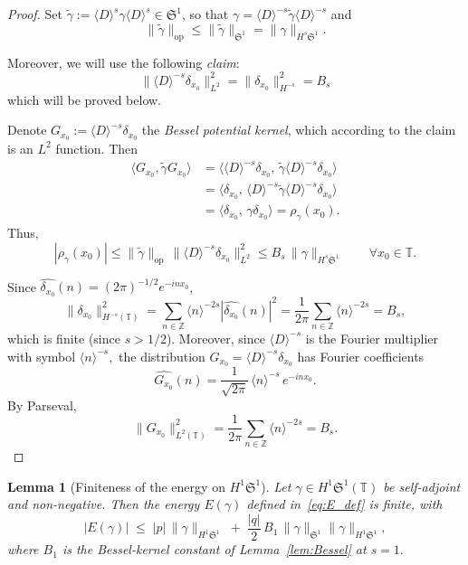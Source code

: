 \documentclass[11pt]{amsart}
\newtheorem{lemma}[theorem]{Lemma}
\theoremstyle{definition}
\newcommand{\T}{\mathbb{T}}
\newcommand{\Z}{\mathbb{Z}}
\newcommand{\Sp}{\mathfrak{S}}
\begin{document}
\begin{proof}
Set $\tilde\gamma:=\langle D\rangle^s\gamma\langle D\rangle^s\in\Sp^1$, so that $\gamma = \langle D\rangle^{-s}\tilde\gamma\langle D\rangle^{-s}$ and
\[
  \|\tilde\gamma\|_{\mathrm{op}}\le\|\tilde\gamma\|_{\Sp^1}=\|\gamma\|_{H^s\Sp^1}.
\]

Moreover, we will use the following {\em claim}:
\begin{equation}\label{eq:Bessel_kernel_norm}
  \|\langle D\rangle^{-s}\delta_{x_0}\|_{L^2}^2 = \|\delta_{x_0}\|_{H^{-s}}^2 = B_s
\end{equation}
which will be proved below.

Denote $G_{x_0}:=\langle D\rangle^{-s}\delta_{x_0}$ the {\em Bessel potential kernel}, which according to the claim is an $L^2$ function. Then
\begin{align*}
  \langle G_{x_0} ,\tilde\gamma G_{x_0} \rangle
  &= \langle\langle D\rangle^{-s}\delta_{x_0} ,\,\tilde\gamma \langle D\rangle^{-s}\delta_{x_0} \rangle \\
  &= \langle\delta_{x_0} ,\,\langle D\rangle^{-s}\tilde\gamma \langle D\rangle^{-s}\delta_{x_0} \rangle \\
  &= \langle\delta_{x_0} ,\, \gamma\delta_{x_0} \rangle = \rho_\gamma(x_0).
\end{align*}
Thus,
\[
  |\rho_\gamma(x_0)|
  \le\|\tilde\gamma\|_{\mathrm{op}}\,\|\langle D\rangle^{-s}\delta_{x_0}\|_{L^2}^2
  \le B_s\,\|\gamma\|_{H^s\Sp^1} \qquad \forall x_0 \in \T.
\]


Since $\widehat{\delta_{x_0}}(n)=(2\pi)^{-1/2}e^{-inx_0}$,
\[
  \|\delta_{x_0}\|_{H^{-s}(\T)}^2
  = \sum_{n\in\Z}\langle n\rangle^{-2s}|\widehat{\delta_{x_0}}(n)|^2
  = \frac{1}{2\pi}\sum_{n\in\Z}\langle n\rangle^{-2s}
  = B_s,
\]
which is finite (since $s>1/2$).
Moreover, since $\langle D\rangle^{-s}$ is the Fourier multiplier with symbol $\langle n\rangle^{-s},$  the distribution $G_{x_0}=\langle D\rangle^{-s}\delta_{x_0}$ has Fourier coefficients
\[
  \widehat{G_{x_0}}(n)
  = \frac{1}{\sqrt{2\pi}}\,\langle n\rangle^{-s}\,e^{-inx_0}.
\]
By Parseval,
\[
\| G_{x_0}\|_{L^2(\T)}^2 =  \frac{1}{2\pi}\sum_{n\in\Z}\langle n\rangle^{-2s} = B_s.
\]

\end{proof}

\begin{lemma}[Finiteness of the energy on $H^1\Sp^1$]\label{lem:E_finite}
Let $\gamma\in H^1\Sp^1(\T)$ be self-adjoint and non-negative. Then the energy $E(\gamma)$ defined in~\eqref{eq:E_def} is finite, with
\begin{equation}\label{eq:E_finite_bound}
  |E(\gamma)|\;\le\;|p|\,\|\gamma\|_{H^1\Sp^1}\;+\;\frac{|q|}{2}\,B_1\,\|\gamma\|_{\Sp^1}\|\gamma\|_{H^1\Sp^1},
\end{equation}
where $B_1$ is the Bessel-kernel constant of Lemma~\ref{lem:Bessel} at $s=1.$
\end{lemma}
\end{document}

